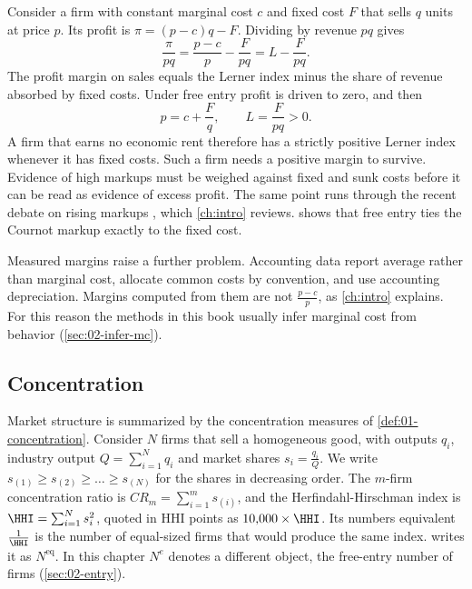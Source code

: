 \begin{remark}\label{rem:02-fixed-costs}
Consider a firm with constant marginal cost $c$ and fixed cost $F$ that sells $q$ units at price $p$. Its profit is
$\pi = (p - c)q - F$. Dividing by revenue $pq$ gives
\[
  \frac{\pi}{pq} = \frac{p - c}{p} - \frac{F}{pq} = L - \frac{F}{pq} .
\]
The profit margin on sales equals the Lerner index minus the share of revenue absorbed by fixed costs. Under free
entry profit is driven to zero, and then
\[
  p = c + \frac{F}{q}, \qquad L = \frac{F}{pq} > 0 .
\]
A firm that earns no economic rent therefore has a strictly positive Lerner index whenever it has fixed costs.
Such a firm needs a positive margin to survive. Evidence of high markups must be weighed against fixed and sunk
costs before it can be read as evidence of excess profit. The same point runs through the recent debate on rising
markups \citep{DeLoeckerEeckhoutUnger2020}, which \cref{ch:intro} reviews.  shows that free
entry ties the Cournot markup exactly to the fixed cost.
\end{remark}

Measured margins raise a further problem. Accounting data report average rather than marginal cost, allocate common
costs by convention, and use accounting depreciation. Margins computed from them are not $\frac{p - c}{p}$, as
\cref{ch:intro} explains. For this reason the methods in this book usually infer marginal cost from behavior
(\cref{sec:02-infer-mc}).

\subsection{Concentration}\label{sec:02-concentration}

Market structure is summarized by the concentration measures of \cref{def:01-concentration}. Consider $N$ firms
that sell a homogeneous good, with outputs $q_i$, industry output $Q = \sum_{i=1}^N q_i$ and market shares
$s_i = \frac{q_i}{Q}$. We write $s_{(1)} \ge s_{(2)} \ge \dots \ge s_{(N)}$ for the shares in decreasing order. The
$m$-firm concentration ratio is $\mathit{CR}_m = \sum_{i=1}^{m} s_{(i)}$, and the Herfindahl-Hirschman index is
$\HHI = \sum_{i=1}^N s_i^2$, quoted in HHI points as $10{,}000 \times \HHI$. Its numbers equivalent
$\frac{1}{\HHI}$ is the number of equal-sized firms that would produce the same index.  writes it
as $N^{\mathrm{eq}}$. In this chapter $N^e$ denotes a different object, the free-entry number of firms
(\cref{sec:02-entry}).

